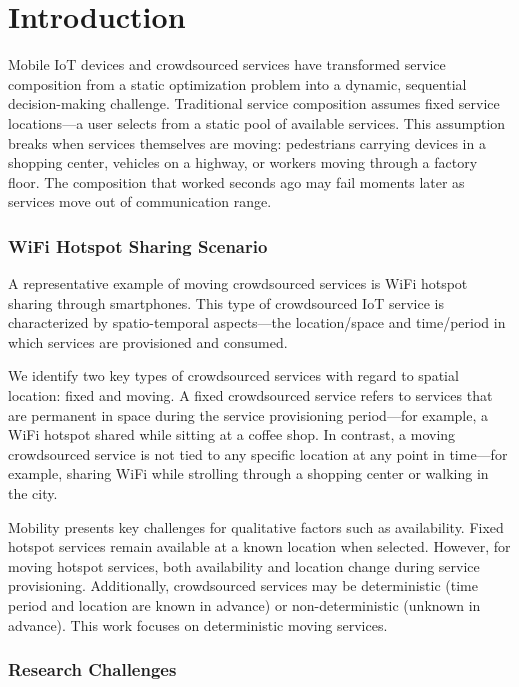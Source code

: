 \section{Introduction}\label{introduction}

Mobile IoT devices and crowdsourced services have transformed service
composition from a static optimization problem into a dynamic,
sequential decision-making challenge. Traditional service composition
assumes fixed service locations---a user selects from a static pool of
available services. This assumption breaks when services themselves are
moving: pedestrians carrying devices in a shopping center, vehicles on a
highway, or workers moving through a factory floor. The composition that
worked seconds ago may fail moments later as services move out of
communication range.

\hypertarget{wifi-hotspot-sharing-scenario}{%
	\subsubsection{WiFi Hotspot Sharing
		Scenario}\label{wifi-hotspot-sharing-scenario}}

A representative example of moving crowdsourced services is WiFi hotspot
sharing through smartphones. This type of crowdsourced IoT service is
characterized by spatio-temporal aspects---the location/space and
time/period in which services are provisioned and consumed.

We identify two key types of crowdsourced services with regard to
spatial location: fixed and moving. A fixed crowdsourced service refers
to services that are permanent in space during the service provisioning
period---for example, a WiFi hotspot shared while sitting at a coffee
shop. In contrast, a moving crowdsourced service is not tied to any
specific location at any point in time---for example, sharing WiFi while
strolling through a shopping center or walking in the city.

Mobility presents key challenges for qualitative factors such as
availability. Fixed hotspot services remain available at a known
location when selected. However, for moving hotspot services, both
availability and location change during service provisioning.
Additionally, crowdsourced services may be deterministic (time period
and location are known in advance) or non-deterministic (unknown in
advance). This work focuses on deterministic moving services.

\hypertarget{research-challenges}{%
	\subsubsection{Research Challenges}\label{research-challenges}}

